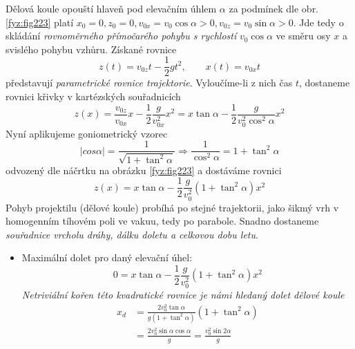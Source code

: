 \begin{example}
  Dělová koule opouští hlaveň pod elevačním úhlem $\alpha$ za podmínek dle obr. 
  \ref{fyz:fig223} platí $x_0=0, z_0=0, v_{0x}=v_0\cos\alpha>0, v_{0z}=v_0\sin\alpha>0$. Jde 
  tedy o skládání \emph{rovnoměrného přímočarého pohybu s rychlostí} $v_0\cos\alpha$ ve směru osy 
  $x$ a svislého pohybu vzhůru. Získané rovnice
  \begin{equation}\label{mech:eq_delo_rce_pohybu}
    z(t)=v_{0z}t-\frac{1}{2}gt^2, \qquad x(t)=v_{0x}t
  \end{equation}
  představují \emph{parametrické rovnice trajektorie}. Vyloučíme-li z nich čas $t$, dostaneme 
  rovnici křivky v kartézských souřadnicích
  \begin{equation}\label{mech:eq_delo_vakuum_param_rce}
    z(x)=  \frac{v_{0z}}{v_{0x}}x-\frac{1}{2}\frac{g}{v_{0x}^2}x^2
        = x\tan\alpha-\frac{1}{2}\frac{g}{v_0^2\cos^2\alpha}x^2
  \end{equation}
  Nyní aplikujeme goniometrický vzorec
  \begin{equation*}
    |cos\alpha|=   \frac{1}{\sqrt{1+\tan^2\alpha}}\Rightarrow \frac{1}{\cos^2\alpha} 
               = 1+\tan^2\alpha
  \end{equation*}
  odvozený dle náčrtku na obrázku \ref{fyz:fig223} a dostáváme rovnici
  \begin{equation}\label{mech_eq_example_vysledna_rce}
    z(x)=x\tan\alpha-\frac{1}{2}\frac{g}{v_0^2}(1+\tan^2\alpha)x^2
  \end{equation}
  Pohyb projektilu (dělové koule) probíhá po stejné trajektorii, jako šikmý vrh v homogenním 
  tíhovém poli ve vakuu, tedy po parabole. Snadno dostaneme \emph{souřadnice vrcholu dráhy, dálku 
  doletu a celkovou dobu letu}.

  \begin{itemize}
    \item Maximální dolet pro daný elevační úhel:
      \begin{equation}\label{mech:eq_elevacni_uhel_1}
        0=x\tan\alpha-\frac{1}{2}\frac{g}{v_0^2}(1+\tan^2\alpha)x^2
      \end{equation}
      \emph{Netriviální kořen této kvadratické rovnice je námi hledaný dolet dělové koule}
      \begin{align}  %
        x_d &=\frac{2v_0^2\tan\alpha}{g(1+\tan^2\alpha)}(1+\tan^2\alpha)        \nonumber \\
            &=\frac{2v_0^2\sin\alpha\cos\alpha}{g}=\frac{v_0^2\sin{2\alpha}}{g} \label{FYZ:eq235}
      \end{align}


\end{itemize}
\end{example}
